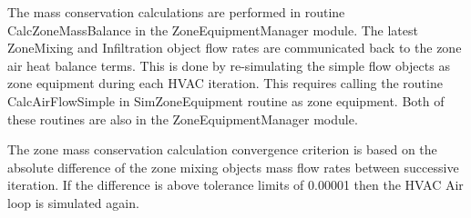 The mass conservation calculations are performed in routine CalcZoneMassBalance in the ZoneEquipmentManager module. The latest ZoneMixing and Infiltration object flow rates are communicated back to the zone air heat balance terms. This is done by re-simulating the simple flow objects as zone equipment during each HVAC iteration. This requires calling the routine CalcAirFlowSimple in SimZoneEquipment routine as zone equipment. Both of these routines are also in the ZoneEquipmentManager module.

The zone mass conservation calculation convergence criterion is based on the absolute difference of the zone mixing objects mass flow rates between successive iteration. If the difference is above tolerance limits of 0.00001 then the HVAC Air loop is simulated again.
